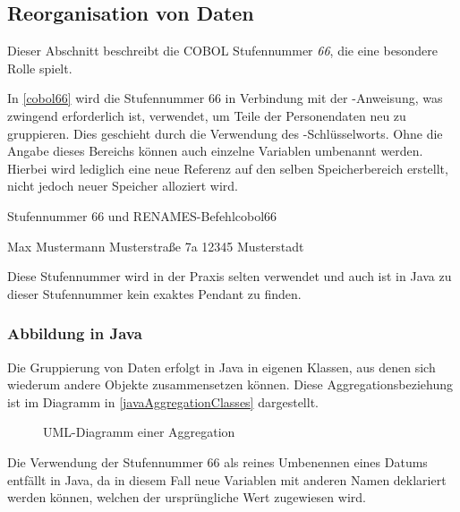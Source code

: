 \subsection{Reorganisation von Daten}
Dieser Abschnitt beschreibt die COBOL Stufennummer \textit{66}, die eine besondere Rolle spielt.

In \autoref{cobol66} wird die Stufennummer 66 in Verbindung mit der -Anweisung, was zwingend erforderlich ist, verwendet, um Teile der Personendaten neu zu gruppieren. Dies geschieht durch die Verwendung des -Schlüsselworts. Ohne die Angabe dieses Bereichs können auch einzelne Variablen umbenannt werden. Hierbei wird lediglich eine neue Referenz auf den selben Speicherbereich erstellt, nicht jedoch neuer Speicher alloziert wird.

\begin{codeWithCaption}{Stufennummer 66 und RENAMES-Befehl}{cobol66}
\begin{shellwindow}
Max       Mustermann
Musterstraße  7a   12345 Musterstadt   
\end{shellwindow}
\end{codeWithCaption}

Diese Stufennummer wird in der Praxis selten verwendet und auch ist in Java zu dieser Stufennummer kein exaktes Pendant zu finden. 
\subsubsection*{Abbildung in Java}
Die Gruppierung von Daten erfolgt in Java in eigenen Klassen, aus denen sich wiederum andere Objekte zusammensetzen können. Diese Aggregationsbeziehung ist im Diagramm in \autoref{javaAggregationClasses} dargestellt. 

\begin{figure}[H]
    \centering
    \caption{UML-Diagramm einer Aggregation}
    \label{javaAggregationClasses}
\end{figure}
Die Verwendung der Stufennummer 66 als reines Umbenennen eines Datums entfällt in Java, da in diesem Fall neue Variablen mit anderen Namen deklariert werden können, welchen der ursprüngliche Wert zugewiesen wird.

